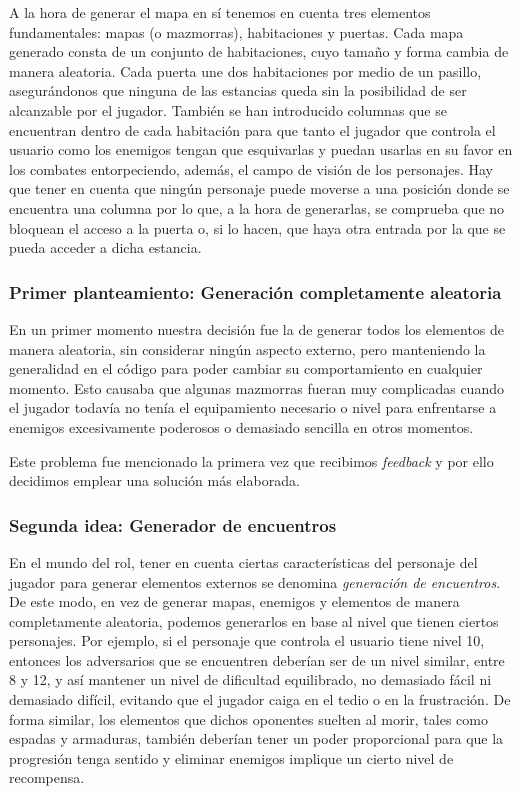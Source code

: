 A la hora de generar el mapa en sí tenemos en cuenta tres elementos fundamentales: mapas (o mazmorras), habitaciones y puertas. Cada mapa generado consta de un conjunto de habitaciones, cuyo tamaño y forma cambia de manera aleatoria. Cada puerta une dos habitaciones por medio de un pasillo, asegurándonos que ninguna de las estancias queda sin la posibilidad de ser alcanzable por el jugador. También se han introducido columnas que se encuentran dentro de cada habitación para que tanto el jugador que controla el usuario como los enemigos tengan que esquivarlas y puedan usarlas en su favor en los combates entorpeciendo, además, el campo de visión de los personajes. Hay que tener en cuenta que ningún personaje puede moverse a una posición donde se encuentra una columna por lo que, a la hora de generarlas, se comprueba que no bloquean el acceso a la puerta o, si lo hacen, que haya otra entrada por la que se pueda acceder a dicha estancia.

\subsubsection{Primer planteamiento: Generación completamente aleatoria}

En un primer momento nuestra decisión fue la de generar todos los elementos de manera aleatoria, sin considerar ningún aspecto externo, pero manteniendo la generalidad en el código para poder cambiar su comportamiento en cualquier momento. Esto causaba que algunas mazmorras fueran muy complicadas cuando el jugador todavía no tenía el equipamiento necesario o nivel para enfrentarse a enemigos excesivamente poderosos o demasiado sencilla en otros momentos.

Este problema fue mencionado la primera vez que recibimos \textit{feedback} y por ello decidimos emplear una solución más elaborada.

\subsubsection{Segunda idea: Generador de encuentros}
\label{generadorencuentros}

En el mundo del rol, tener en cuenta ciertas características del personaje del jugador para generar elementos externos se denomina \textit{generación de encuentros}. De este modo, en vez de generar mapas, enemigos y elementos de manera completamente aleatoria, podemos generarlos en base al nivel que tienen ciertos personajes. Por ejemplo, si el personaje que controla el usuario tiene nivel 10, entonces los adversarios que se encuentren deberían ser de un nivel similar, entre 8 y 12, y así mantener un nivel de dificultad equilibrado, no demasiado fácil ni demasiado difícil, evitando que el jugador caiga en el tedio o en la frustración. De forma similar, los elementos que dichos oponentes suelten al morir, tales como espadas y armaduras, también deberían tener un poder proporcional para que la progresión tenga sentido y eliminar enemigos implique un cierto nivel de recompensa.

